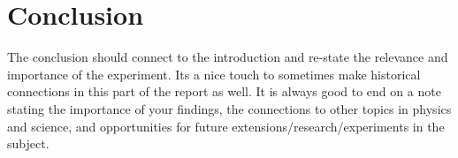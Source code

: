 \documentclass[12pt]{article}
\begin{document}
\section{Conclusion}
    The conclusion should connect to the introduction and re-state the relevance and importance of the experiment. Its a nice touch to sometimes make historical connections in this part of the report as well. It is always good to end on a note stating the importance of your findings, the connections to other topics in physics and science, and opportunities for future extensions/research/experiments in the subject.
    
%
%
%	
%	
    









\end{document}
